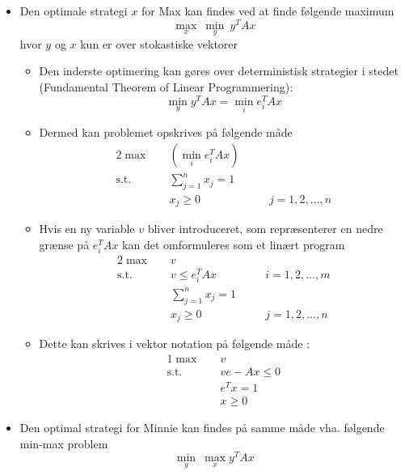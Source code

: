 \begin{itemize}
  \item Den optimale strategi $x$ for Max kan findes ved at finde følgende maximum
  \begin{equation*}
    \max_x \ \min_y \ y^T A x
  \end{equation*}
  hvor $y$ og $x$ kun er over stokastiske vektorer  
  \begin{itemize}
    \item Den inderste optimering kan gøres over deterministisk strategier i stedet (Fundamental Theorem of Linear Programmering):
    \begin{equation*}
      \min_y y^T Ax = \min_i e_i^T Ax
    \end{equation*}
    \item Dermed kan problemet opskrives på følgende måde
    \begin{alignat*}{2}
      \max \quad  &  (\min_i e_i ^T A x) && \\
      \text{s.t.} \quad & \sum_{j=1}^n x_j = 1 && \\
      & x_j \geq 0 && \quad j=1,2,\dots,n
    \end{alignat*}
    \item Hvis en ny variable $v$ bliver introduceret, som repræsenterer en nedre grænse på $e_i^T Ax$ kan det omformuleres som et linært program
    \begin{alignat*}{2}
      \max \quad  & v && \\
      \text{s.t.} \quad &  v \leq e_i ^T A x && \quad  i = 1,2,\dots,m \\
      & \sum_{j=1}^n x_j = 1 && \\
      & x_j \geq 0 && \quad j=1,2,\dots,n
    \end{alignat*}
    \item Dette kan skrives i vektor notation på følgende måde :
    \begin{alignat*}{1}
      \max \quad  & v \\
      \text{s.t.} \quad &  ve-Ax \leq 0 \\
      & e^T x = 1 \\
      & x \geq 0
    \end{alignat*}
  \end{itemize}
  \item Den optimal strategi for Minnie kan findes på samme måde vha. følgende min-max problem 
  \begin{equation*}
    \min_y \ \max_x y^TAx
  \end{equation*}

\end{itemize}
